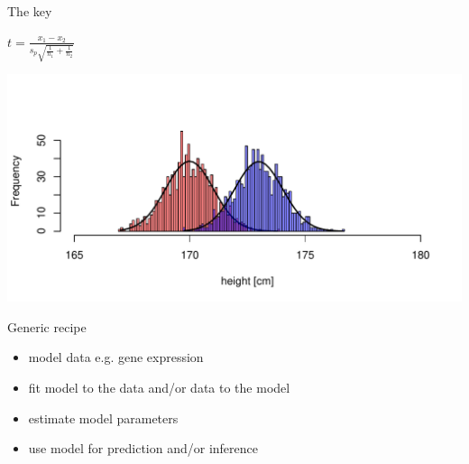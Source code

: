 \documentclass{beamer}\usepackage[]{graphicx}\usepackage[]{color}
\makeatletter
\def\maxwidth{ %
  \ifdim\Gin@nat@width>\linewidth
    \linewidth
  \else
    \Gin@nat@width
  \fi
}
\newenvironment{knitrout}{}{} %
\makeatother
\begin{document}
\begin{frame}
\begin{block}{The key}
\begin{flushright}
$t=\frac{x_1-x_2}{s_p\sqrt{\frac{1}{n_1}+\frac{1}{n_2}}}$
\end{flushright}
\begin{knitrout}
\color{fgcolor}
\includegraphics[width=\maxwidth]{figure/ttest-1} 

\end{knitrout}
\end{block}
\end{frame}


\begin{frame}
\begin{block}{Generic recipe}
\begin{itemize}
\item model data e.g. gene expression
\item fit model to the data and/or data to the model
\item estimate model parameters
\item use model for prediction and/or inference
\end{itemize}
\end{block}
\end{frame}
\end{document}
